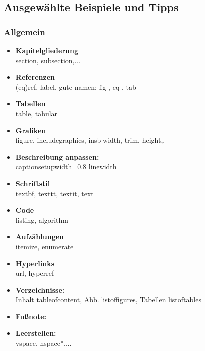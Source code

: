 \subsection{Ausgewählte Beispiele und Tipps}
\subsubsection{Allgemein}
\begin{itemize}
	\item \textbf{Kapitelgliederung}\\
	section, subsection,...
	\item \textbf{Referenzen}\\
	 (eq)ref, label, gute namen: fig-, eq-, tab- 
	\item \textbf{Tabellen}\\
	table, tabular
	\item \textbf{Grafiken}\\
	figure, includegraphics, insb width, trim, height,.
	\item \textbf{Beschreibung anpassen:} \\
	captionsetup{width=0.8 linewidth}
	\item \textbf{Schriftstil}\\
	textbf, texttt, textit, text
	\item \textbf{Code}\\
	listing, algorithm
	\item \textbf{Aufzählungen}\\
	itemize, enumerate
	\item \textbf{Hyperlinks}\\
	url, hyperref
	\item \textbf{Verzeichnisse:}\\
	Inhalt tableofcontent, Abb. listoffigures, Tabellen listoftables
	\item \textbf{Fußnote:} 
	\item \textbf{Leerstellen:}\\
	vspace, hspace*,...\\
\end{itemize}

